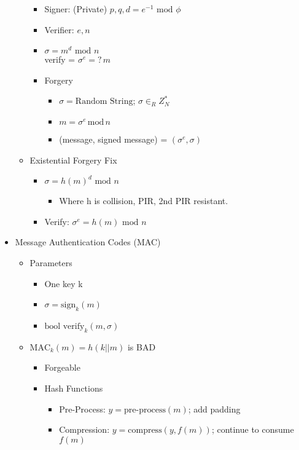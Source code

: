 \begin{itemize}
\begin{itemize}
\begin{itemize}
        \item Signer: (Private) $p, q, d = e^{-1} \text{ mod } \phi$
        \item Verifier: $e,n$
        \item $\sigma = m^d \text{ mod } n$
        \\verify = $\sigma^e =?\,m$
        \item Forgery
            \begin{itemize}
            \item $\sigma = \text{Random String}$; $\sigma \in_R Z_N^*$
            \item $m = \sigma^e\,\text{mod}\,n$
            \item (message, signed message) = $(\sigma^e, \sigma)$
            \end{itemize}
        \end{itemize}
    \item Existential Forgery Fix
        \begin{itemize}
        \item $\sigma = h(m)^d \text{ mod } n$
            \begin{itemize}
            \item Where h is collision, PIR, 2nd PIR resistant. 
            \end{itemize}
        \item Verify: $\sigma^e = h(m) \text{ mod } n$
        \end{itemize}
    \end{itemize}
\item Message Authentication Codes (MAC)  
\begin{itemize}  
    \item Parameters  
    \begin{itemize}  
        \item One key k  
        \item $\sigma = \text{sign}_k(m)$ 
        \item $\text{bool verify}_k(m,\sigma)$ 
    \end{itemize}  
    \item $\text{MAC}_k(m) = h(k||m)$ is BAD  
        \begin{itemize}  
        \item Forgeable  
        \item Hash Functions 
            \begin{itemize} 
            \item Pre-Process: $y = \text{pre-process}(m)$; add padding         \item Compression: $y = \text{compress}(y, f(m))$; continue to consume $f(m)$  

\end{itemize}
\end{itemize}
\end{itemize}
\end{itemize}
